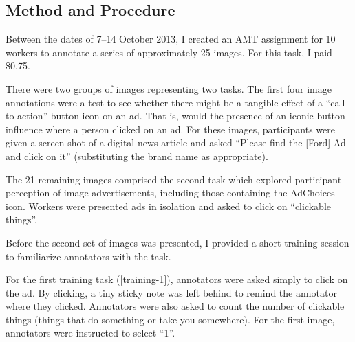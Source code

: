 \subsection{Method and Procedure}
\label{methodandprocedure}

Between the dates of 7--14 October 2013, I created an AMT assignment for 10 workers to annotate a series of approximately 25 images. For this task, I paid \$0.75. 

There were two groups of images representing two tasks. The first four image annotations were a test to see whether there might be a tangible effect of a ``call-to-action'' button icon on an ad. That is, would the presence of an iconic button influence where a person clicked on an ad. For these images, participants were given a screen shot of a digital news article and asked ``Please find the [Ford] Ad and click on it'' (substituting the brand name as appropriate).

The 21 remaining images comprised the second task which explored participant perception of image advertisements, including those containing the AdChoices icon. Workers were presented ads in isolation and asked to click on ``clickable things''. 

Before the second set of images was presented, I provided a short training session to familiarize annotators with the task. 

For the first training task  (\autoref{training-1}),  annotators were asked simply to click on the ad. By clicking, a tiny sticky note was left behind to remind the annotator where they clicked. Annotators were also asked to count the number of clickable things (things that do something or take you somewhere). For the first image, annotators were instructed to select ``1''.


